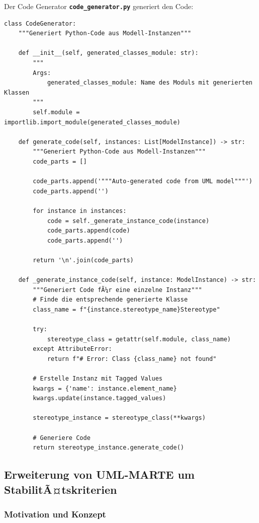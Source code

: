 ﻿\documentclass[a4paper,12pt]{scrreprt}
\theoremstyle{definition}
\begin{document}
Der Code Generator \texttt{\textbf{code\_generator.py}} generiert den Code:
\begin{lstlisting}[style=python, caption={ProfileParser Implementierung}, label={lst:profile-parser}]
class CodeGenerator:
    """Generiert Python-Code aus Modell-Instanzen"""
    
    def __init__(self, generated_classes_module: str):
        """
        Args:
            generated_classes_module: Name des Moduls mit generierten Klassen
        """
        self.module = importlib.import_module(generated_classes_module)
    
    def generate_code(self, instances: List[ModelInstance]) -> str:
        """Generiert Python-Code aus Modell-Instanzen"""
        code_parts = []
        
        code_parts.append('"""Auto-generated code from UML model"""')
        code_parts.append('')
        
        for instance in instances:
            code = self._generate_instance_code(instance)
            code_parts.append(code)
            code_parts.append('')
        
        return '\n'.join(code_parts)
    
    def _generate_instance_code(self, instance: ModelInstance) -> str:
        """Generiert Code fÃ¼r eine einzelne Instanz"""
        # Finde die entsprechende generierte Klasse
        class_name = f"{instance.stereotype_name}Stereotype"
        
        try:
            stereotype_class = getattr(self.module, class_name)
        except AttributeError:
            return f"# Error: Class {class_name} not found"
        
        # Erstelle Instanz mit Tagged Values
        kwargs = {'name': instance.element_name}
        kwargs.update(instance.tagged_values)
        
        stereotype_instance = stereotype_class(**kwargs)
        
        # Generiere Code
        return stereotype_instance.generate_code()
\end{lstlisting}

\subsection{Erweiterung von UML-MARTE um StabilitÃ¤tskriterien}
\label{sec:marte-stability}

\subsubsection{Motivation und Konzept}
\end{document}

